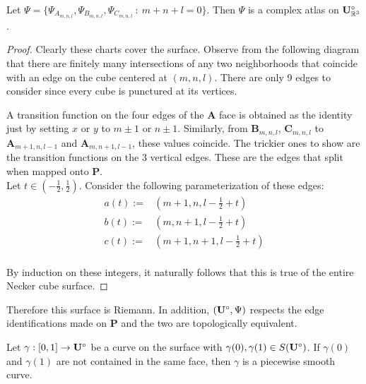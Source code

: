 \documentclass[a4paper, 11pt]{article}
\begin{document}
\begin{thm}
Let $\Psi=\{\Psi_{A_{m,n,l}},\Psi_{B_{m,n,l}},\Psi_{C_{m,n,l}}~:~m+n+l=0 \}$. Then $\Psi$ is a complex atlas on $\mathbf{U}^\circ_{\mathbb{R}^3}$.
\begin{proof}
Clearly these charts cover the surface. Observe from the following diagram that there are finitely many intersections of any two neighborhoods that coincide with an edge on the cube centered at $(m,n,l)$. There are only 9 edges to consider since every cube is punctured at its vertices.
\begin{figure}[H]
\centering

\end{figure}
A transition function on the four edges of the $\mathbf{A}$ face is obtained as the identity just by setting $x$ or $y$ to $m\pm1$ or $n\pm1$. Similarly, from $\mathbf{B}_{m,n,l}$, $\mathbf{C}_{m,n,l}$ to $\mathbf{A}_{m+1,n,l-1}$ and $\mathbf{A}_{m,n+1,l-1}$, these values coincide. The trickier ones to show are the transition functions on the 3 vertical edges. These are the edges that split when mapped onto $\mathbf{P}$. \\
Let $t\in(-\frac{1}{2},\frac{1}{2})$. Consider the following parameterization of these edges:
\begin{align*}
a(t):=&(m+1,n,l-\frac{1}{2}+t)\\
b(t):=&(m,n+1,l-\frac{1}{2}+t)\\
c(t):=&(m+1,n+1,l-\frac{1}{2}+t)\\
\end{align*}  


By induction on these integers, it naturally follows that this is true of the entire Necker cube surface.
\end{proof}

\end{thm}

Therefore this surface is Riemann. In addition, $(\mathbf{U}^\circ,\Psi)$ respects the edge identifications made on $\mathbf{P}$ and the two are topologically equivalent. 


Let $\gamma:[0,1]\rightarrow\mathbf{U}^\circ$ be a curve on the surface with $\gamma(0),\gamma(1)\in S(\mathbf{U}^\circ)$. If $\gamma(0)$ and $\gamma(1)$ are not contained in the same face, then $\gamma$ is a piecewise smooth curve.
\end{document}
